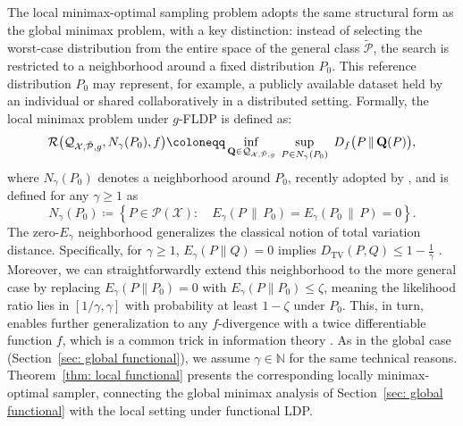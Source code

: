 \documentclass[accepted]{article}
\theoremstyle{plain} %
\theoremstyle{definition}
\theoremstyle{remark}
\newcommand{\bQ}{\mathbf{Q}}
\begin{document}
The local minimax-optimal sampling problem adopts the same structural form as the global minimax problem, with a key distinction: instead of selecting the worst-case distribution from the entire space of the general class \( \tilde{\mathcal{P}} \), the search is restricted to a neighborhood around a fixed distribution $P_0$. This reference distribution $P_0$  may represent, for example, a publicly available dataset held by an individual or shared collaboratively in a distributed setting. Formally, the local minimax problem under \( g \)-FLDP is defined as:
\begin{equation}\label{eqn: local minimax functional problem} \mathcal{R}\big(\mathcal{Q}_{\mathcal{X},\tilde{\mathcal{P}},g},N_\gamma(P_0),f\big) \coloneqq \inf_{\bQ \in \mathcal{Q}_{\mathcal{X},\tilde{\mathcal{P}},g}} \hspace{0.1cm} \sup_{P \in N_\gamma(P_0)}\hspace{0.1cm} D_f\big(P \, \| \, \bQ(P)\big),
\end{equation}
where $N_\gamma(P_0)$ denotes a neighborhood around $P_0$, recently adopted by  \citet{feldman2024instance}, and is defined for any $\gamma\geq 1$ as
\begin{equation}\label{eqn: ngb}N_\gamma(P_0) \coloneqq  \left\{ P \in \mathcal{P}(\mathcal{X}) :\quad E_\gamma(P \, \| \, P_0) =  E_\gamma(P_0 \, \| \, P) = 0  \right\}. \end{equation}
The zero-\( E_\gamma \) neighborhood generalizes the classical notion of total variation distance. Specifically, for \( \gamma \geq 1 \), \( E_\gamma(P \| Q) = 0 \) implies \( D_{\mathrm{TV}}(P, Q) \leq 1 - \tfrac{1}{\gamma} \) \citep[Proposition~4]{liu2016e_}. Moreover, we can straightforwardly extend this neighborhood to the more general case by replacing \( E_\gamma(P \| P_0) = 0 \) with \( E_\gamma(P \| P_0) \leq \zeta \), meaning the likelihood ratio lies in \( [1/\gamma, \gamma] \) with probability at least \( 1 - \zeta \) under \( P_0 \). This, in turn, enables further generalization to any \( f \)-divergence with a twice differentiable function \( f \), which is a common trick in information theory \citep{polyanskiy2015dissipation,raginsky2016strong,zamanlooy2023strong,asoodeh2024contraction}.
As in the global case (Section~\ref{sec: global functional}), we assume \( \gamma \in \mathbb{N} \) for the same technical reasons. Theorem~\ref{thm: local functional} presents the corresponding locally minimax-optimal sampler, connecting the global minimax analysis of Section~\ref{sec: global functional} with the local setting under functional LDP. 
\end{document}

